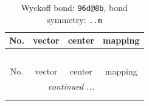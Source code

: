 \documentclass[fleqn,8pt]{jsarticle}
\begin{document}
\renewcommand{\arraystretch}{1.2}
\begin{longtable}{cccc}
\caption{Wyckoff bond: {\tt 96d@8b}, bond symmetry: {\tt ..m}}
 \\
 \hline \hline
No. & vector & center & mapping \\ \hline \endfirsthead

\multicolumn{3}{l}{\tablename\ \thetable{}} \\
 \hline \hline
No. & vector & center & mapping \\ \hline \endhead

 \hline \hline
\multicolumn{3}{r}{\footnotesize\it continued ...} \\ \endfoot

 \hline \hline
\multicolumn{3}{r}{} \\ \endlastfoot


\end{longtable}
\end{document}
